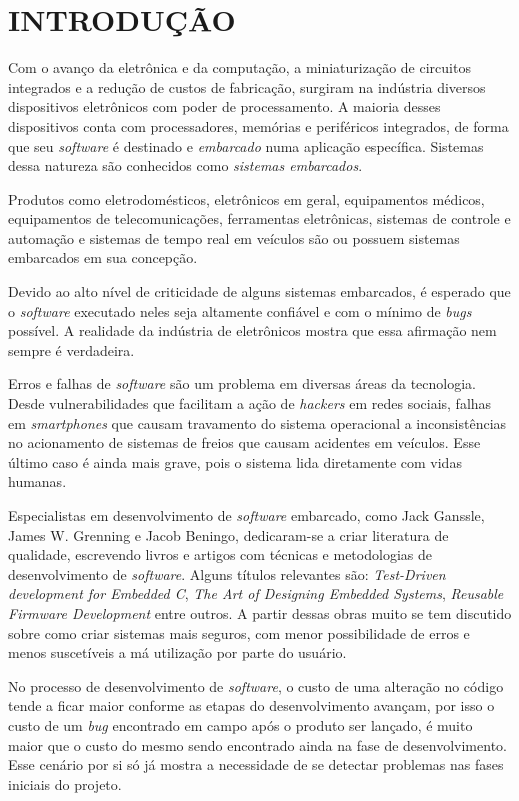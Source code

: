 \documentclass[times, twoside, watermark]{artigo}
\begin{document}
\section{INTRODUÇÃO}

Com o avanço da eletrônica e da computação, a miniaturização de circuitos integrados e a redução de
custos de fabricação, surgiram na indústria diversos dispositivos eletrônicos com poder de
processamento. 
A maioria desses dispositivos conta com processadores, memórias e periféricos integrados, 
de forma que seu \textit{software} é destinado e \textit{embarcado} numa aplicação específica. 
Sistemas dessa natureza são conhecidos como \textit{sistemas embarcados}.

Produtos como eletrodomésticos, eletrônicos em geral, equipamentos médicos, equipamentos de
telecomunicações, ferramentas eletrônicas, sistemas de controle e automação e sistemas de tempo real
em veículos são ou possuem sistemas embarcados em sua concepção.

Devido ao alto nível de criticidade de alguns sistemas embarcados, é esperado que o \textit{software}
executado neles seja altamente confiável e com o mínimo de \textit{bugs} possível. 
A realidade da indústria de eletrônicos mostra que essa afirmação nem sempre é verdadeira.

Erros e falhas de \textit{software} são um problema em diversas áreas da tecnologia. 
Desde vulnerabilidades que facilitam a ação de \textit{hackers} em redes sociais, falhas em 
\textit{smartphones} que causam travamento do sistema operacional a inconsistências no 
acionamento de sistemas de freios que causam acidentes em veículos. 
Esse último caso é ainda mais grave, pois o sistema lida diretamente com vidas humanas. 

Especialistas em desenvolvimento de \textit{software} embarcado, como Jack Ganssle, James W. Grenning
e Jacob Beningo, dedicaram-se a criar literatura de qualidade, escrevendo livros e artigos com
técnicas e metodologias de desenvolvimento de \textit{software}. Alguns títulos relevantes são:
\textit{Test-Driven development for Embedded C}\cite{tddembeddedc}, \textit{The Art of Designing
Embedded Systems}\cite{ganssle2008art},
\textit{Reusable Firmware Development}\cite{beningo2017reusable} entre outros. 
A partir dessas obras muito se tem discutido sobre como criar sistemas mais seguros, com menor
possibilidade de erros e menos suscetíveis a má utilização por parte do usuário.

No processo de desenvolvimento de \textit{software}, o custo de uma alteração no código tende a ficar
maior conforme  as etapas do desenvolvimento avançam, por isso o custo de um \textit{bug} encontrado
em campo após o produto ser lançado, é muito maior que o custo do mesmo sendo encontrado ainda na fase
de desenvolvimento\cite{firmwarecost}.
Esse cenário por si só já mostra a necessidade de se detectar problemas nas fases iniciais do projeto.
\end{document}
